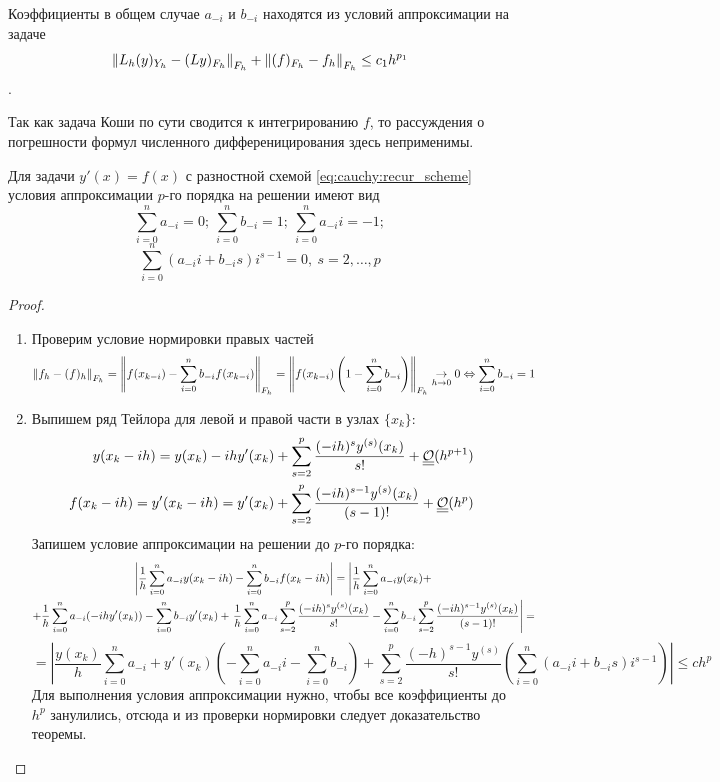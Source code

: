 Коэффициенты в общем случае $a_{-i}$ и $b_{-i}$ находятся из условий
аппроксимации на задаче
\[\left\lVert L_h(y)_{Y_h} - (Ly)_{F_h}\right\rVert_{F_h}+\left\lVert(f)_{F_h}-f_h\right\rVert_{F_h}\leq c_1h^{p_1}\].

\begin{remark}
  Так как задача Коши по сути сводится к интегрированию $f$, то
  рассуждения о погрешности формул численного дифференицирования здесь неприменимы.
\end{remark}

\begin{theorem}
  Для задачи $y'(x)=f(x)$ с разностной схемой \eqref{eq:cauchy:recur_scheme}
  условия аппроксимации $p$-го порядка на решении имеют вид
  \[\sum_{i=0}^na_{-i}=0;\ \sum_{i=0}^nb_{-i}=1;\ \sum_{i=0}^na_{-i}i=-1;\]
  \[\sum_{i=0}^n(a_{-i}i+b_{-i}s)i^{s-1}=0,\ s=2,\ldots,p\]
\end{theorem}
\begin{proof}
  \begin{enumerate}
    \item Проверим условие нормировки правых частей
          \[\left\lVert f_h-(f)_h\right\rVert_{F_h}=\left\lVert f(x_{k-i})-\sum_{i=0}^nb_{-i}f(x_{k-i})\right\rVert_{F_h}=\left\lVert f(x_{k-i})\left(1-\sum_{i=0}^nb_{-i}\right)\right\rVert_{F_h}\underset{h\rightarrow0}{\rightarrow}0\Leftrightarrow\sum_{i=0}^nb_{-i}=1\]
    \item Выпишем ряд Тейлора для левой и правой части в узлах $\{x_k\}$:
          \begin{align*}
            y(x_k-ih)=y(x_k)-ihy'(x_k)+\sum_{s=2}^{p}\frac{(-ih)^{s}y^{(s)}(x_k)}{s!} + \underline{\underline{\mathcal{O}}}(h^{p+1})       \\
            f(x_k-ih)=y'(x_k-ih)=y'(x_k)+\sum_{s=2}^{p}\frac{(-ih)^{s-1}y^{(s)}(x_k)}{(s-1)!} + \underline{\underline{\mathcal{O}}}(h^{p}) \\
          \end{align*}
          Запишем условие аппроксимации на решении до $p$-го порядка:
          \begin{multline*}
            \left\lvert\frac{1}{h}\sum_{i=0}^na_{-i}y(x_k-ih)-\sum_{i=0}^nb_{-i}f(x_k-ih)\right\rvert
            = \left|\frac{1}{h}\sum_{i=0}^na_{-i}y(x_k)+\right. \\
            +\frac{1}{h}\sum_{i=0}^na_{-i}(-ihy'(x_k))-\sum_{i=0}^nb_{-i}y'(x_k)+\left.\frac{1}{h}\sum_{i=0}^na_{-i}\sum_{s=2}^{p}\frac{(-ih)^sy^{(s)}(x_k)}{s!}-\sum_{i=0}^nb_{-i}\sum_{s=2}^{p}\frac{(-ih)^{s-1}y^{(s)}(x_k)}{(s-1)!}\right|=
          \end{multline*}
          \[
            =\left|\frac{y(x_k)}{h}\sum_{i=0}^na_{-i}+y'(x_k)\left(-\sum_{i=0}^na_{-i}i-\sum_{i=0}^nb_{-i}\right)
            +\sum_{s=2}^{p}\frac{(-h)^{s-1}y^{(s)}}{s!}\left(\sum_{i=0}^n(a_{-i}i+b_{-i}s)i^{s-1}\right)\right|\leq ch^p
          \]
          Для выполнения условия аппроксимации нужно, чтобы все коэффициенты до $h^p$ занулились, отсюда
          и из проверки нормировки следует доказательство теоремы.
  \end{enumerate}
\end{proof}
